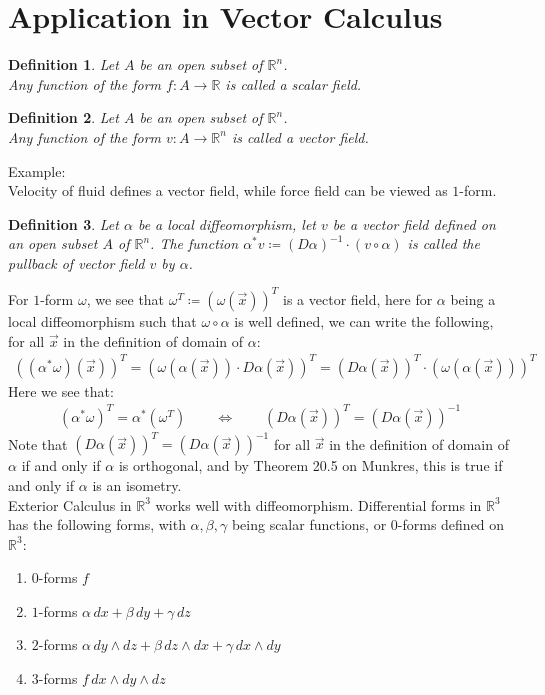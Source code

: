 \documentclass[15pt]{book}
\theoremstyle{break}
\theoremstyle{break}
\newtheorem{defn}{Definition}[corL]
\newcommand{\R}{\mathbb{R}}
\newcommand{\example}{\color{green}Example: \color{black}}
\begin{document}
\newpage
\section[Application in Vector Calculus]{\color{red}Application in Vector Calculus\color{black}}

\begin{defn}
Let $A$ be an open subset of $\R^n$. \\
Any function of the form $f: A \to \R$ is called a scalar field.
\end{defn}

\begin{defn}
Let $A $ be an open subset of $\R^n$. \\
Any function of the form $v :A \to \R^n$ is called a vector field.
\end{defn}

\example \\
Velocity of fluid defines a vector field, while force field can be viewed as $1$-form.\\

\begin{defn}
Let $\alpha$ be a local diffeomorphism, let $v$ be a vector field defined on an open subset $A$ of $\R^n$. The function $\alpha^*v \coloneqq (D\alpha)^{-1} \cdot (v\circ \alpha)$ is called the pullback of vector field $v$ by $\alpha$. 
\end{defn}

For $1$-form $\omega$, we see that $\omega^T\coloneqq \left(\omega(\vec{x})\right)^T$ is a vector field, here for $\alpha$ being a local diffeomorphism such that $\omega \circ \alpha$ is well defined, we can write the following, for all $\vec{x}$ in the definition of domain of $\alpha$:
\begin{align*}
((\alpha^*\omega)(\vec{x}))^T = (\omega(\alpha(\vec{x})) \cdot D\alpha(\vec{x}))^T = (D\alpha(\vec{x}))^T \cdot (\omega(\alpha(\vec{x})))^T 
\end{align*}
Here we see that:
\begin{align*}
(\alpha^*\omega)^T = \alpha^*(\omega^T)\qquad \iff \qquad (D\alpha(\vec{x}))^T = (D\alpha(\vec{x}))^{-1}
\end{align*}
Note that $(D\alpha(\vec{x}))^T = (D\alpha(\vec{x}))^{-1}$ for all $\vec{x}$ in the definition of domain of $\alpha$ if and only if $\alpha$ is orthogonal, and by Theorem 20.5 on Munkres, this is true if and only if $\alpha$ is an isometry.\\


Exterior Calculus in $\R^3$ works well with diffeomorphism. Differential forms in $\R^3$ has the following forms, with $\alpha,\beta,\gamma$ being scalar functions, or $0$-forms defined on $\R^3$:
\begin{enumerate}[topsep=3pt,itemsep=-1ex,partopsep=1ex,parsep=1ex]
\item $0$-forms $f$
\item $1$-forms $\alpha\, dx + \beta\, dy + \gamma\, dz$
\item $2$-forms $\alpha\, dy \wedge dz + \beta \, dz\wedge dx + \gamma\, dx\wedge dy$
\item $3$-forms $f \, dx \wedge dy\wedge dz$
\end{enumerate}
\end{document}
